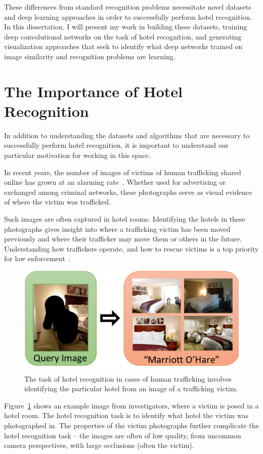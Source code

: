 These differences from standard recognition problems necessitate novel datasets and deep learning approaches in order to successfully perform hotel recognition. In this dissertation, I will present my work in building these datasets, training deep convolutional networks on the task of hotel recognition, and generating visualization approaches that seek to identify what deep networks trained on image similarity and recognition problems are learning.

\section{The Importance of Hotel Recognition}
In addition to understanding the datasets and algorithms that are necessary to successfully perform hotel recognition, it is important to understand our particular motivation for working in this space.

In recent years, the number of images of victims of human trafficking shared online has grown at an alarming rate~\cite{bouche2015report,ncmecAmicusBrief}. Whether used for advertising or exchanged among criminal networks, these photographs serve as visual evidence of where the victim was trafficked.

Such images are often captured in hotel rooms. Identifying the hotels in these photographs gives insight into where a trafficking victim has been moved previously and where their trafficker may move them or others in the future. Understanding how traffickers operate, and how to rescue victims is a top priority for law enforcement~\cite{nationalStrategy}.

\begin{figure}
    \centering
    \includegraphics[width=.7\columnwidth]{figures/chapter1/victimQuery_to_hotel.png}
    \caption{The task of hotel recognition in cases of human trafficking involves identifying the particular hotel from an image of a trafficking victim.}
    \label{fig:victimQuery_to_hotel}
\end{figure}

Figure~\ref{fig:victimQuery_to_hotel} shows an example image from investigators, where a victim is posed in a hotel room. The hotel recognition task is to identify what hotel the victim was photographed in. The properties of the victim photographs further complicate the hotel recognition task -- the images are often of low quality, from uncommon camera perspectives, with large occlusions (often the victim).


